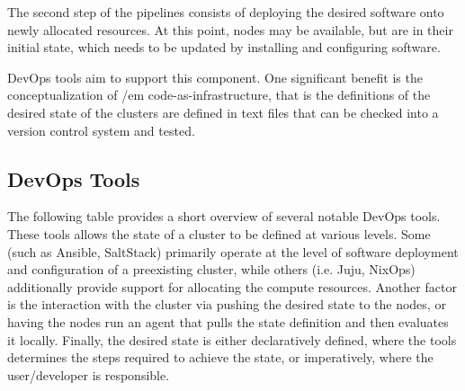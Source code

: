 \documentclass[9pt,twocolumn,twoside]{styles/osajnl}
\begin{document}
The second step of the pipelines consists of deploying the desired
software onto newly allocated resources. At this point, nodes may be
available, but are in their initial state, which needs to be updated
by installing and configuring software.


DevOps tools aim to support this component. One significant benefit is
the conceptualization of {/em code-as-infrastructure}, that is the
definitions of the desired state of the clusters are defined in text
files that can be checked into a version control system and tested.

\subsection{DevOps Tools}

The following table provides a short overview of several notable
DevOps tools. These tools allows the state of a cluster to be defined
at various levels. Some (such as Ansible, SaltStack) primarily operate
at the level of software deployment and configuration of a preexisting
cluster, while others (i.e. Juju, NixOps) additionally provide support
for allocating the compute resources. Another factor is the
interaction with the cluster via pushing the desired state to the
nodes, or having the nodes run an agent that pulls the state
definition and then evaluates it locally. Finally, the desired state
is either declaratively defined, where the tools determines the steps
required to achieve the state, or imperatively, where the
user/developer is responsible.
\end{document}

